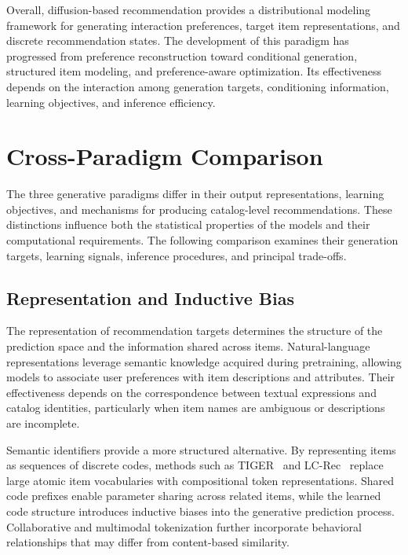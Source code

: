 \documentclass[sigconf,nonacm]{acmart}
\begin{document}
Overall, diffusion-based recommendation
provides a distributional modeling
framework for generating interaction
preferences, target item representations,
and discrete recommendation states.
The development of this paradigm has
progressed from preference reconstruction
toward conditional generation, structured
item modeling, and preference-aware
optimization. Its effectiveness depends
on the interaction among generation
targets, conditioning information,
learning objectives, and inference
efficiency.



\section{Cross-Paradigm Comparison}
\label{sec:comparison}

The three generative paradigms differ in their output
representations, learning objectives, and mechanisms for
producing catalog-level recommendations. These distinctions
influence both the statistical properties of the models
and their computational requirements. The following comparison
examines their generation targets, learning signals, inference
procedures, and principal trade-offs.



\subsection{Representation and Inductive Bias}

The representation of recommendation targets determines
the structure of the prediction space and the information
shared across items. Natural-language representations
leverage semantic knowledge acquired during pretraining,
allowing models to associate user preferences with item
descriptions and attributes. Their effectiveness depends
on the correspondence between textual expressions and
catalog identities, particularly when item names are
ambiguous or descriptions are incomplete.

Semantic identifiers provide a more structured
alternative. By representing items as sequences of
discrete codes, methods such as TIGER~\cite{tiger}
and LC-Rec~\cite{lcrec} replace large atomic item
vocabularies with compositional token representations.
Shared code prefixes enable parameter sharing across
related items, while the learned code structure
introduces inductive biases into the generative
prediction process. Collaborative and multimodal
tokenization further incorporate behavioral relationships
that may differ from content-based similarity.
\end{document}
